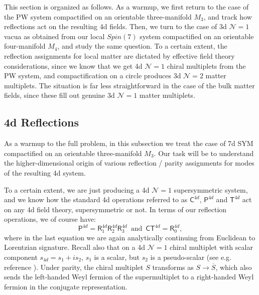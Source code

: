 \documentclass[12pt]{article}%
\numberwithin{equation}{section}
\renewcommand{\(}{\left(}
\renewcommand{\)}{\right)}
\renewcommand{\[}{\left[}
\renewcommand{\]}{\right]}
\begin{document}

This section is organized as follows. As a warmup, we first return to the case of the PW system compactified
on an orientable three-manifold $M_3$, and track how reflections act on
the resulting 4d fields. Then, we turn to the case of 3d $\mathcal{N} = 1$ vacua as obtained from our local $Spin(7)$ system
compactified on an orientable four-manifold $M_4$, and study the same question. To a certain extent, the reflection assignments
for local matter are dictated by effective field theory considerations, since we know that we
get 4d $\mathcal{N} = 1$ chiral multiplets from the PW system, and compactification on a circle produces 3d $\mathcal{N} = 2$ matter multiplets.
The situation is far less straightforward in the case of the bulk matter fields, since these fill out genuine 3d $\mathcal{N} = 1$
matter multiplets.

\subsection{4d Reflections}

As a warmup to the full problem, in this subsection we treat the case of 7d SYM compactified on an orientable three-manifold $M_3$.
Our task will be to understand the higher-dimensional origin of various reflection / parity assignments for modes of the resulting 4d system.

To a certain extent, we are just producing a 4d $\mathcal{N} = 1$ supersymmetric system, and we know how the
standard 4d operations referred to as $\mathsf{C}^{4d}$, $\mathsf{P}^{4d}$ and $\mathsf{T}^{4d}$ act on any 4d field theory, supersymmetric or not. In terms of our reflection operations, we of course have:
\begin{equation}
\mathsf{P}^{4d} = \mathsf{R}^{4d}_{1} \mathsf{R}^{4d}_{2} \mathsf{R}^{4d}_{3} \,\,\, \text{and}  \,\,\,  \mathsf{CT}^{4d} = \mathsf{R}^{4d}_{0},
\end{equation}
where in the last equation we are again analytically continuing from Euclidean to Lorentzian signature. Recall also that on a 4d $\mathcal{N} = 1$ chiral multiplet with scalar component $s_{4d} = s_1 + i s_2$, $s_1$ is a scalar, but $s_2$ is a pseudo-scalar (see e.g. reference \cite{Weinberg:2000cr}). Under parity, the chiral multiplet $S$ transforms as $S \rightarrow \overline{S}$, which also sends the left-handed
Weyl fermion of the supermultiplet to a right-handed Weyl fermion in the conjugate representation.
\end{document}
